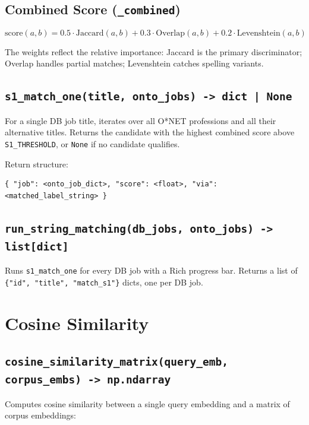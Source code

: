 ﻿\documentclass[12pt,a4paper]{article}
\begin{document}
\subsection{Combined Score (\texttt{\_combined})}

\begin{equation}
  \text{score}(a, b) = 0.5 \cdot \text{Jaccard}(a,b) + 0.3 \cdot \text{Overlap}(a,b) + 0.2 \cdot \text{Levenshtein}(a,b)
\end{equation}

The weights reflect the relative importance: Jaccard is the primary discriminator; Overlap handles partial matches; Levenshtein catches spelling variants.

\subsection{\texttt{s1\_match\_one(title, onto\_jobs) -> dict | None}}

For a single DB job title, iterates over all O*NET professions and all their alternative titles. Returns the candidate with the highest combined score above \texttt{S1\_THRESHOLD}, or \texttt{None} if no candidate qualifies.

Return structure:
\begin{lstlisting}
{ "job": <onto_job_dict>, "score": <float>, "via": <matched_label_string> }
\end{lstlisting}

\subsection{\texttt{run\_string\_matching(db\_jobs, onto\_jobs) -> list[dict]}}

Runs \texttt{s1\_match\_one} for every DB job with a Rich progress bar. Returns a list of \texttt{\{"id", "title", "match\_s1"\}} dicts, one per DB job.

\clearpage
\section{Cosine Similarity}

\subsection{\texttt{cosine\_similarity\_matrix(query\_emb, corpus\_embs) -> np.ndarray}}

Computes cosine similarity between a single query embedding and a matrix of corpus embeddings:
\end{document}
